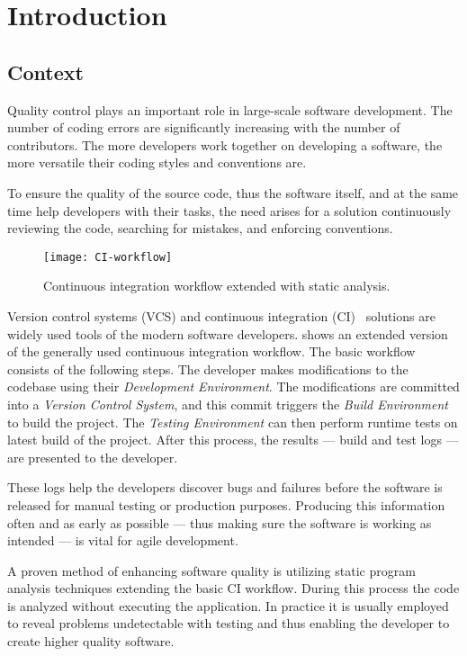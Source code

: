 \chapter{Introduction}
\label{chap:introduction}

\section{Context}

Quality control plays an important role in large-scale software development. The number of coding errors are significantly increasing with the number of contributors. The more developers work together on developing a software, the more versatile their coding styles and conventions are.

To ensure the quality of the source code, thus the software itself, and at the same time help developers with their tasks, the need arises for a solution continuously reviewing the code, searching for mistakes, and enforcing conventions.

\begin{figure}[!ht]
	\centering
	\texttt{[image: CI-workflow]}
	\caption{Continuous integration workflow extended with static analysis.}
	\label{fig:CI-workflow}
\end{figure}

Version control systems (VCS) and continuous integration (CI)~\cite{CI} solutions are widely used tools of the modern software developers.  shows an extended version of the generally used continuous integration workflow.
The basic workflow consists of the following steps. The developer makes modifications to the codebase using their \textit{Development Environment}. The modifications are committed into a \textit{Version Control System}, and this commit triggers the \textit{Build Environment} to build the project. The \textit{Testing Environment} can then perform runtime tests on latest build of the project. After this process, the results --- build and test logs --- are presented to the developer.

These logs help the developers discover bugs and failures before the software is released for manual testing or production purposes. Producing this information often and as early as possible --- thus making sure the software is working as intended --- is vital for agile development.

A proven method of enhancing software quality is utilizing static program analysis techniques extending the basic CI workflow. During this process the code is analyzed without executing the application. In practice it is usually employed to reveal problems undetectable with testing and thus enabling the developer to create higher quality software.


